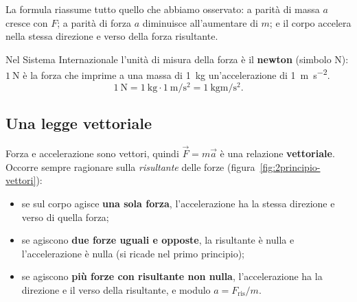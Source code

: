 La formula riassume tutto quello che abbiamo osservato: a parità di massa $a$ cresce con $F$; a parità di forza $a$ diminuisce all'aumentare di $m$; e il corpo accelera nella stessa direzione e verso della forza risultante.

\begin{definizione}
Nel Sistema Internazionale l'unità di misura della forza è il \textbf{newton} (simbolo \si{\newton}): $\SI{1}{\newton}$ è la forza che imprime a una massa di \SI{1}{\kilo\gram} un'accelerazione di \SI{1}{\metre\per\second\squared}.
\[ \SI{1}{\newton} = \SI{1}{\kilo\gram} \cdot \SI{1}{\metre\per\second\squared} = \SI{1}{\kilo\gram\metre\per\second\squared}. \]
\end{definizione}

\subsection{Una legge vettoriale}
Forza e accelerazione sono vettori, quindi $\vec F = m\vec a$ è una relazione \textbf{vettoriale}. Occorre sempre ragionare sulla \emph{risultante} delle forze (figura~\ref{fig:2principio-vettori}):
\begin{itemize}
    \item se sul corpo agisce \textbf{una sola forza}, l'accelerazione ha la stessa direzione e verso di quella forza;
    \item se agiscono \textbf{due forze uguali e opposte}, la risultante è nulla e l'accelerazione è nulla (si ricade nel primo principio);
    \item se agiscono \textbf{più forze con risultante non nulla}, l'accelerazione ha la direzione e il verso della risultante, e modulo $a = F_{\text{ris}}/m$.
\end{itemize}

